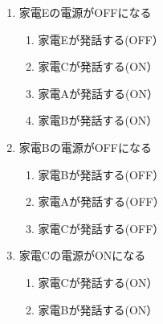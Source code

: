 \documentclass[a4j,12pt,twoside]{jreport}
\begin{document}
\begin{multicols}{2}
\begin{enumerate}
		\item 家電Eの電源がOFFになる
		\begin{enumerate}	
			\item 家電Eが発話する(OFF）
			\item 家電Cが発話する(ON）
			\item 家電Aが発話する(ON）
			\item 家電Bが発話する(ON）
		\end{enumerate}
		\item 家電Bの電源がOFFになる
		\begin{enumerate}
			\item 家電Bが発話する(OFF）
			\item 家電Aが発話する(OFF）
			\item 家電Cが発話する(OFF）
		\end{enumerate}
		
		\item 家電Cの電源がONになる
		\begin{enumerate}
			\item 家電Cが発話する(ON）
			\item 家電Bが発話する(ON）
		\end{enumerate}
	\end{enumerate}
\end{multicols}	
\newpage
\end{document}
